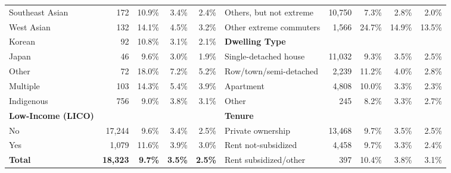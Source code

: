 \documentclass[10 pt,letterpaper]{article}
\begin{document}
\begin{table}[H]
{\begin{tabular}{lrrrrlrrrr}
			Southeast Asian                 & 172             & 10.9\%         & 3.4\%          & 2.4\%          & Others, but not extreme      & 10,750      & 7.3\%          & 2.8\%         & 2.0\%            \\
			West Asian                      & 132             & 14.1\%         & 4.5\%          & 3.2\%          & Other extreme commuters & 1,566      & 24.7\%         & 14.9\%        & 13.5\%            \\
			Korean                          & 92              & 10.8\%         & 3.1\%          & 2.1\%          & \textbf{Dwelling Type}       &        &                &               &               \\
			Japan                           & 46              & 9.6\%          & 3.0\%          & 1.9\%          & Single-detached house        & 11,032 & 9.3\%          & 3.5\%         & 2.5\%         \\
			Other                           & 72              & 18.0\%         & 7.2\%          & 5.2\%          & Row/town/semi-detached       & 2,239  & 11.2\%         & 4.0\%         & 2.8\%         \\
			Multiple                        & 103             & 14.3\%         & 5.4\%          & 3.9\%          & Apartment                    & 4,808  & 10.0\%         & 3.3\%         & 2.3\%         \\
			Indigenous                      & 756             & 9.0\%          & 3.8\%          & 3.1\%          & Other                        & 245    & 8.2\%          & 3.3\%         & 2.7\%         \\ 
			\textbf{Low-Income (LICO)}      &                 &                &                &                & \textbf{Tenure}              &        &                &               &               \\
			No                              & 17,244          & 9.6\%          & 3.4\%          & 2.5\%          & Private ownership            & 13,468 & 9.7\%          & 3.5\%         & 2.5\%         \\
			Yes                             & 1,079           & 11.6\%         & 3.9\%          & 3.0\%          & Rent not-subsidized          & 4,458  & 9.7\%          & 3.3\%         & 2.4\%         \\ \cline{1-5}
			\textbf{Total}                  & \textbf{18,323} & \textbf{9.7\%} & \textbf{3.5\%} & \textbf{2.5\%} & Rent subsidized/other        & 397    & 10.4\%         & 3.8\%         & 3.1\%   
			

\end{tabular}}
\end{table}
\end{document}
